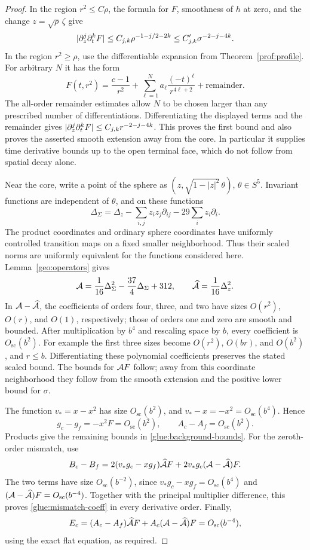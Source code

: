 \begin{proof}
In the region $r^2\le C\rho$, the formula for $F$, smoothness of $h$ at
zero, and the change $z=\sqrt\rho\,\zeta$ give
\[
 \lvert \partial_z^j\partial_t^k F\rvert
 \le C_{j,k}\rho^{-1-j/2-2k}
 \le C'_{j,k}\sigma^{-2-j-4k}.
\]
In the region $r^2\ge\rho$, use the differentiable expansion from
Theorem~\ref{prof:profile}.  For arbitrary $N$ it has the form
\begin{equation}\label{glue:outer-expansion}
 F(t,r^2)=\frac{c-1}{r^2}
       +\sum_{\ell=1}^{N}a_\ell\frac{(-t)^\ell}{r^{4\ell+2}}
       +\text{remainder}.
\end{equation}
The all-order remainder estimates allow $N$ to be chosen larger than
any prescribed number of differentiations.  Differentiating the
displayed terms and the remainder gives
$\lvert \partial_z^j\partial_t^kF\rvert\le C_{j,k}r^{-2-j-4k}$.
This proves the first bound and also proves the asserted smooth
extension away from the core.  In particular it supplies time
derivative bounds up to the open terminal face, which do not follow
from spatial decay alone.

Near the core, write a point of the sphere as
$(z,\sqrt{1-|z|^2}\,\theta)$, $\theta\in S^5$.  Invariant functions
are independent of $\theta$, and on these functions
\begin{equation}\label{glue:laplace-coordinate}
 \Delta_\Sigma
 =\Delta_z-\sum_{i,j}z_i z_j\partial_{ij}
             -29\sum_i z_i\partial_i.
\end{equation}
The product coordinates and ordinary sphere coordinates have
uniformly controlled transition maps on a fixed smaller
neighborhood.  Thus their scaled norms are uniformly equivalent for
the functions considered here.  Lemma~\ref{geo:operators} gives
\[
 \mathcal A=\frac1{16}\Delta_\Sigma^2
       -\frac{37}{4}\Delta_\Sigma+312,
 \qquad \widehat{\mathcal A}=\frac1{16}\Delta_z^2.
\]
In $\mathcal A-\widehat{\mathcal A}$, the coefficients of orders four, three, and two have
sizes $O(r^2)$, $O(r)$, and $O(1)$, respectively; those of orders one
and zero are smooth and bounded.  After multiplication by $b^4$ and
rescaling space by $b$, every coefficient is $O_{\mathrm{sc}}(b^2)$.
For example the first three sizes become $O(r^2)$, $O(br)$, and
$O(b^2)$, and $r\le b$.  Differentiating these polynomial coefficients
preserves the stated scaled bound.  The bounds for $\mathcal A F$ follow;
away from this coordinate neighborhood they follow from the smooth
extension and the positive lower bound for $\sigma$.

The function $v_*=x-x^2$ has size $O_{\mathrm{sc}}(b^2)$, and
$v_*-x=-x^2=O_{\mathrm{sc}}(b^4)$.  Hence
\[
 g_c-g_f=-x^2F=O_{\mathrm{sc}}(b^2),\qquad
 A_c-A_f=O_{\mathrm{sc}}(b^2).
\]
Products give the remaining bounds in
\eqref{glue:background-bounds}.  For the zeroth-order mismatch, use
\[
 B_c-B_f
 =2(v_*g_c-xg_f)\widehat{\mathcal A} F
        +2v_*g_c(\mathcal A-\widehat{\mathcal A})F.
\]
The two terms have size $O_{\mathrm{sc}}(b^{-2})$, since
$v_*g_c-xg_f=O_{\mathrm{sc}}(b^4)$ and
$(\mathcal A-\widehat{\mathcal A})F=O_{\mathrm{sc}}(b^{-4})$.
Together with the principal multiplier difference, this proves
\eqref{glue:mismatch-coeff} in every derivative order.  Finally,
\[
 E_c=(A_c-A_f)\widehat{\mathcal A} F+A_c(\mathcal A-\widehat{\mathcal A})F
      =O_{\mathrm{sc}}(b^{-4}),
\]
using the exact flat equation, as required.
\end{proof}

